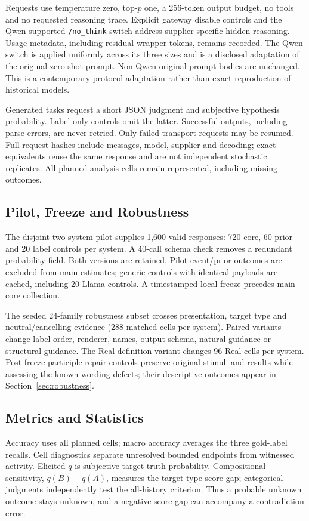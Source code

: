 \documentclass[sigconf,anonymous,review]{acmart}
\begin{document}
Requests use temperature zero, top-$p$ one, a 256-token output budget, no tools and no requested reasoning trace. Explicit gateway disable controls and the Qwen-supported \texttt{/no\_think} switch address supplier-specific hidden reasoning. Usage metadata, including residual wrapper tokens, remains recorded. The Qwen switch is applied uniformly across its three sizes and is a disclosed adaptation of the original zero-shot prompt. Non-Qwen original prompt bodies are unchanged. This is a contemporary protocol adaptation rather than exact reproduction of historical models.

Generated tasks request a short JSON judgment and subjective hypothesis probability. Label-only controls omit the latter. Successful outputs, including parse errors, are never retried. Only failed transport requests may be resumed. Full request hashes include messages, model, supplier and decoding; exact equivalents reuse the same response and are not independent stochastic replicates. All planned analysis cells remain represented, including missing outcomes.

\subsection{Pilot, Freeze and Robustness}
The disjoint two-system pilot supplies 1,600 valid responses: 720 core, 60 prior and 20 label controls per system. A 40-call schema check removes a redundant probability field. Both versions are retained. Pilot event/prior outcomes are excluded from main estimates; generic controls with identical payloads are cached, including 20 Llama controls. A timestamped local freeze precedes main core collection.

The seeded 24-family robustness subset crosses presentation, target type and neutral/cancelling evidence (288 matched cells per system). Paired variants change label order, renderer, names, output schema, natural guidance or structural guidance. The Real-definition variant changes 96 Real cells per system. Post-freeze participle-repair controls preserve original stimuli and results while assessing the known wording defects; their descriptive outcomes appear in Section~\ref{sec:robustness}.

\subsection{Metrics and Statistics}
Accuracy uses all planned cells; macro accuracy averages the three gold-label recalls. Cell diagnostics separate unresolved bounded endpoints from witnessed activity. Elicited $q$ is subjective target-truth probability. Compositional sensitivity, $q(B)-q(A)$, measures the target-type score gap; categorical judgments independently test the all-history criterion. Thus a probable unknown outcome stays unknown, and a negative score gap can accompany a contradiction error.
\end{document}
